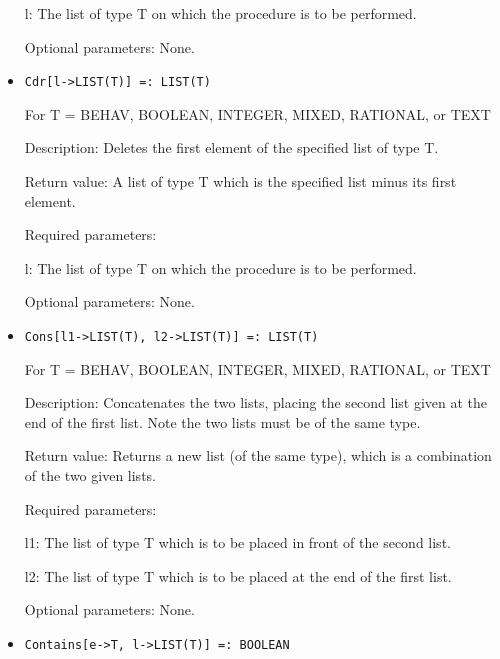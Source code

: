\begin{itemize}
\bd
\item
[l:] The list of type T on which the procedure is to be performed.
\ed

\item
[Optional parameters:] None.
\ed

\item

\protect \large \begin{verbatim}
Cdr[l->LIST(T)] =: LIST(T)
\end{verbatim}\normalsize

For T = BEHAV, BOOLEAN, INTEGER, MIXED, RATIONAL, or TEXT

\bd
\item
[Description:] Deletes the first element of the specified list of type
T.
\item 
[Return value:] A list of type T which is the specified list minus its
first element.
\item   
[Required parameters:]\hfil\null

\bd
\item
[l:] The list of type T on which the procedure is to be performed.
\ed
\item
[Optional parameters:] None.
\ed

\item

\protect \large \begin{verbatim}
Cons[l1->LIST(T), l2->LIST(T)] =: LIST(T)
\end{verbatim}\normalsize

For T = BEHAV, BOOLEAN, INTEGER, MIXED, RATIONAL, or TEXT

\bd
\item
[Description:] Concatenates the two lists, placing the second list
given at the end of the first list.  Note the two lists must be of the
same type.
\item 
[Return value:] Returns a new list (of the same type), which is a
combination of the two given lists.
\item
[Required parameters:]\hfil\null

\bd
\item
[l1:] The list of type T which is to be placed in front of the second
list.
\item 
[l2:] The list of type T which is to be placed at the end of the first
list.
\ed

\item
[Optional parameters:] None.
\ed

\item
\protect \large \begin{verbatim}
Contains[e->T, l->LIST(T)] =: BOOLEAN
\end{verbatim}\normalsize


\end{itemize}

